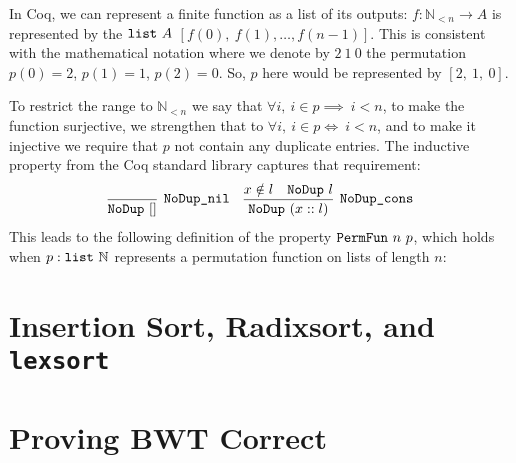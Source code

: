 \documentclass[11pt]{thesis}
\begin{document}
In Coq, we can represent a finite function as a list of its outputs:
$f : \mathbb{N}_{<n} \to A$ is represented by the $\texttt{list}~A$
$[f(0),~f(1),\ldots,f(n-1)]$. This is consistent with the mathematical
notation where we denote by $2~1~0$ the permutation $p(0) = 2$, $p(1)
= 1$, $p(2) = 0$. So, $p$ here would be represented by $[2,~1,~0]$.

To restrict the range to $\mathbb{N}_{<n}$ we say that $\forall i,~i \in p
\implies ~i<n$, to make the function surjective, we strengthen that to
$\forall i,~i \in p \iff ~i<n$, and to make it injective we require that $p$ not
contain any duplicate entries. The inductive property  from
the Coq standard library captures that requirement:
\begin{align*}
  \infer[\var{NoDup\_nil}]{\var{NoDup}~[]}{}
  &&
  \infer[\var{NoDup\_cons}]{\var{NoDup}~(x :: l)}{%
    x \notin l & \var{NoDup}~l
  }
\end{align*}
This leads to the following definition of the property
$\texttt{PermFun}~n~p$, which holds when $p : \texttt{list}~\mathbb{N}$
represents a permutation function on lists of length $n$:






\section{Insertion Sort, Radixsort, and \texttt{lexsort}}
\label{sec:sort}


\section{Proving BWT Correct}
\label{sec:BWT_proof}

\printbibliography{}
\end{document}
